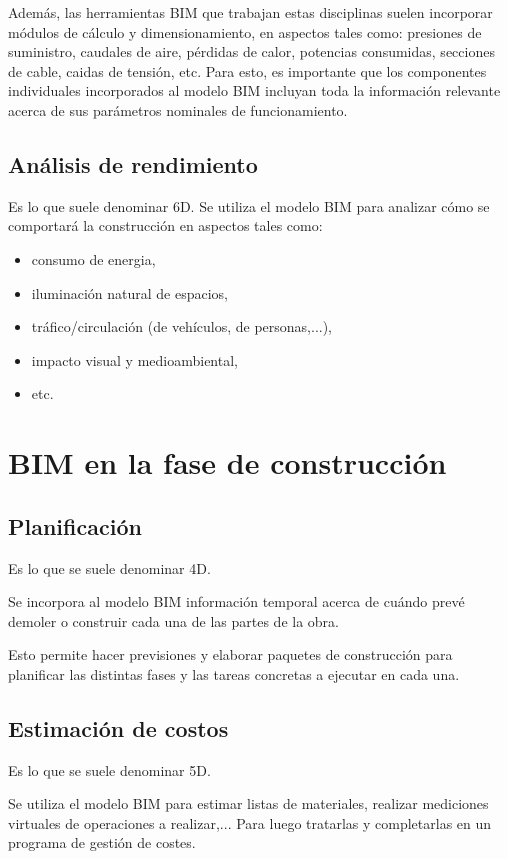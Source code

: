 \documentclass[spanish,12pt,a4paper,final,oneside]{book}
\begin{document}
Además, las herramientas BIM que trabajan estas disciplinas suelen incorporar módulos de cálculo y dimensionamiento, en aspectos tales como: presiones de suministro, caudales de aire, pérdidas de calor, potencias consumidas, secciones de cable, caidas de tensión, etc. Para esto, es importante que los componentes individuales incorporados al modelo BIM incluyan toda la información relevante acerca de sus parámetros nominales de funcionamiento.

\section{Análisis de rendimiento}
Es lo que suele denominar 6D. Se utiliza el modelo BIM para analizar cómo se comportará la construcción en aspectos tales como:
\begin{itemize}
\item consumo de energia,
\item iluminación natural de espacios,
\item tráfico/circulación (de vehículos, de personas,...),
\item impacto visual y medioambiental,
\item etc.
\end{itemize}

\chapter{BIM en la fase de construcción}

\section{Planificación}
Es lo que se suele denominar 4D. 

Se incorpora al modelo BIM información temporal acerca de cuándo prevé demoler o construir cada una de las partes de la obra.

Esto permite hacer previsiones y elaborar paquetes de construcción para planificar las distintas fases y las tareas concretas a ejecutar en cada una.

\section{Estimación de costos}
Es lo que se suele denominar 5D.

Se utiliza el modelo BIM para estimar listas de materiales, realizar mediciones virtuales de operaciones a realizar,... Para luego tratarlas y completarlas en un programa de gestión de costes.
\end{document}
